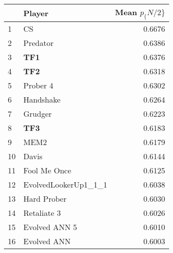 \begin{tabular}{llr}
\toprule
{} &                Player &  Mean $p_\{N/2\}$ \\
\midrule
1  &                    CS &          0.6676 \\
2  &              Predator &          0.6386 \\
3  &                   \textbf{TF1} &          0.6376 \\
4  &                   \textbf{TF2} &          0.6318 \\
5  &              Prober 4 &          0.6302 \\
6  &             Handshake &          0.6264 \\
7  &               Grudger &          0.6223 \\
8  &                   \textbf{TF3} &          0.6183 \\
9  &                  MEM2 &          0.6179 \\
10 &                 Davis &          0.6144 \\
11 &          Fool Me Once &          0.6125 \\
12 &  EvolvedLookerUp1\_1\_1 &          0.6038 \\
13 &           Hard Prober &          0.6030 \\
14 &           Retaliate 3 &          0.6026 \\
15 &         Evolved ANN 5 &          0.6010 \\
16 &           Evolved ANN &          0.6003 \\
\bottomrule
\end{tabular}
